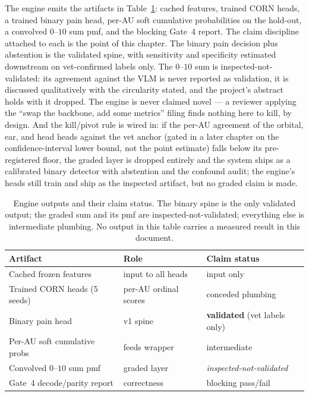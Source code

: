 The engine emits the artifacts in Table~\ref{tab:eng-outputs}: cached features,
trained CORN heads, a trained binary pain head, per-AU soft cumulative
probabilities on the hold-out, a convolved $0$--$10$ sum pmf, and the blocking
Gate~4 report. The claim discipline attached to each is the point of this
chapter. The binary pain decision plus abstention is the validated spine, with
sensitivity and specificity estimated downstream on vet-confirmed labels only.
The $0$--$10$ sum is inspected-not-validated: its agreement against the VLM is
never reported as validation, it is discussed qualitatively with the circularity
stated, and the project's abstract holds with it dropped. The engine is never
claimed novel --- a reviewer applying the ``swap the backbone, add some
metrics'' filing finds nothing here to kill, by design. And the kill/pivot rule
is wired in: if the per-AU agreement of the orbital, ear, and head heads against
the vet anchor (gated in a later chapter on the confidence-interval lower bound,
not the point estimate) falls below its pre-registered floor, the graded layer
is dropped entirely and the system ships as a calibrated binary detector with
abstention and the confound audit; the engine's heads still train and ship as
the inspected artifact, but no graded claim is made.

\begin{table}[t]
\centering
\footnotesize
\caption[Phase~B engine outputs and claim status]{Engine outputs and their claim
status. The binary spine is the only validated output; the graded sum and its
pmf are inspected-not-validated; everything else is intermediate plumbing. No
output in this table carries a measured result in this document.}
\label{tab:eng-outputs}
\begin{tabular}{@{}lll@{}}
\toprule
Artifact & Role & Claim status \\
\midrule
Cached frozen features        & input to all heads      & input only \\
Trained CORN heads (5 seeds)  & per-AU ordinal scores   & conceded plumbing \\
Binary pain head              & v1 spine                & \textbf{validated} (vet labels only) \\
Per-AU soft cumulative probs  & feeds wrapper           & intermediate \\
Convolved $0$--$10$ sum pmf   & graded layer            & \emph{inspected-not-validated} \\
Gate~4 decode/parity report   & correctness            & blocking pass/fail \\
\bottomrule
\end{tabular}
\end{table}

